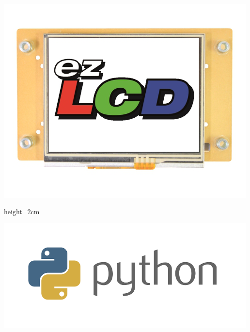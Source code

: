   
\begin{DoxyImage}
\includegraphics{ezLCD-303Front.png}
\caption{height=2cm}
\end{DoxyImage}
 
\begin{DoxyImageNoCaption}
  \mbox{\includegraphics{python.png}}
\end{DoxyImageNoCaption}
 